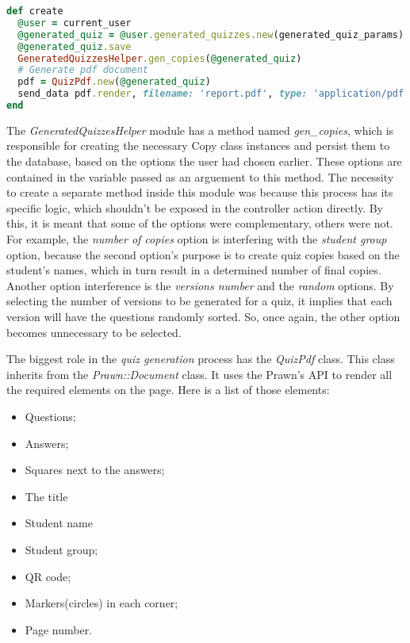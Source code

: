 \begin{lstlisting}[language=Ruby, caption={Create method of the GeneratedQuizzesController class}, label=create_method]
def create
  @user = current_user
  @generated_quiz = @user.generated_quizzes.new(generated_quiz_params)
  @generated_quiz.save
  GeneratedQuizzesHelper.gen_copies(@generated_quiz)
  # Generate pdf document
  pdf = QuizPdf.new(@generated_quiz)
  send_data pdf.render, filename: 'report.pdf', type: 'application/pdf', disposition: 'inline'
end
\end{lstlisting}

The \textit{GeneratedQuizzesHelper} module has a method named \textit{gen\_copies}, which is responsible for creating the necessary Copy class instances and persist them to the database, based on the options the user had chosen earlier. These options are contained in the variable passed as an arguement to this method. The necessity to create a separate method inside this module was because this process has its specific logic, which shouldn't be exposed in the controller action directly. By this, it is meant that some of the options were complementary, others were not. For example, the \textit{number of copies} option is interfering with the \textit{student group} option, because the second option's purpose is to create quiz copies based on the student's names, which in turn result in a determined number of final copies. Another option interference is the \textit{versions number} and the \textit{random} options. By selecting the number of versions to be generated for a quiz, it implies that each version will have the questions randomly sorted. So, once again, the other option becomes unnecessary to be selected.

The biggest role in the \textit{quiz generation} process has the \textit{QuizPdf} class. This class inherits from the \textit{Prawn::Document} class. It uses the Prawn's API to render all the required elements on the page. Here is a list of those elements: 
\begin{itemize}
  \item Questions;
  \item Answers;
  \item Squares next to the answers;
  \item The title
  \item Student name 
  \item Student group;
  \item QR code;
  \item Markers(circles) in each corner;
  \item Page number.
\end{itemize}

